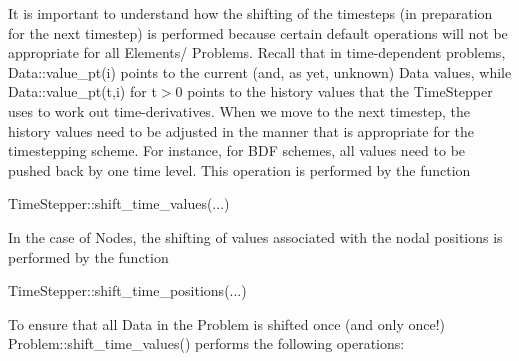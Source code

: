 It is important to understand how the shifting of the timesteps (in preparation for the next timestep) is performed because certain default operations will not be appropriate for all {\ttfamily Elements/} {\ttfamily Problems}. Recall that in time-\/dependent problems, {\ttfamily Data\+::value\+\_\+pt(i)} points to the current (and, as yet, unknown) {\ttfamily Data} values, while {\ttfamily Data\+::value\+\_\+pt(t,i)} for t$>$0 points to the history values that the {\ttfamily Time\+Stepper} uses to work out time-\/derivatives. When we move to the next timestep, the history values need to be adjusted in the manner that is appropriate for the timestepping scheme. For instance, for B\+DF schemes, all values need to be pushed back by one time level. This operation is performed by the function 
\begin{DoxyCode}
TimeStepper::shift\_time\_values(...) 
\end{DoxyCode}
 In the case of {\ttfamily Nodes}, the shifting of values associated with the nodal positions is performed by the function 
\begin{DoxyCode}
TimeStepper::shift\_time\_positions(...) 
\end{DoxyCode}
 To ensure that all {\ttfamily Data} in the {\ttfamily Problem} is shifted once (and only once!) {\ttfamily Problem\+::shift\+\_\+time\+\_\+values()} performs the following operations\+:
